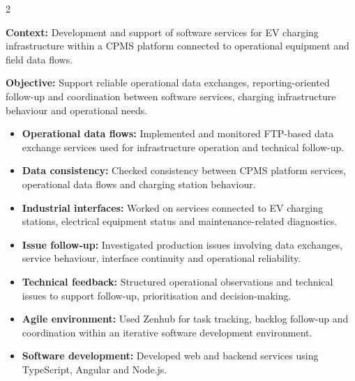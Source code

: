 \documentclass[8pt,a4paper,ragged2e,withhyper]{altacv}
\begin{document}



\makecvheader
\vspace{-0.3cm}


\begin{paracol}{2}



\textbf{Context:} Development and support of software services for EV charging infrastructure within a CPMS platform connected to operational equipment and field data flows.

\textbf{Objective:} Support reliable operational data exchanges, reporting-oriented follow-up and coordination between software services, charging infrastructure behaviour and operational needs.

\begin{itemize}
  \item \textbf{Operational data flows:} Implemented and monitored FTP-based data exchange services used for infrastructure operation and technical follow-up.
  \item \textbf{Data consistency:} Checked consistency between CPMS platform services, operational data flows and charging station behaviour.
  \item \textbf{Industrial interfaces:} Worked on services connected to EV charging stations, electrical equipment status and maintenance-related diagnostics.
  \item \textbf{Issue follow-up:} Investigated production issues involving data exchanges, service behaviour, interface continuity and operational reliability.
  \item \textbf{Technical feedback:} Structured operational observations and technical issues to support follow-up, prioritisation and decision-making.
  \item \textbf{Agile environment:} Used Zenhub for task tracking, backlog follow-up and coordination within an iterative software development environment.
  \item \textbf{Software development:} Developed web and backend services using TypeScript, Angular and Node.js.
\end{itemize}


\end{paracol}
\end{document}
